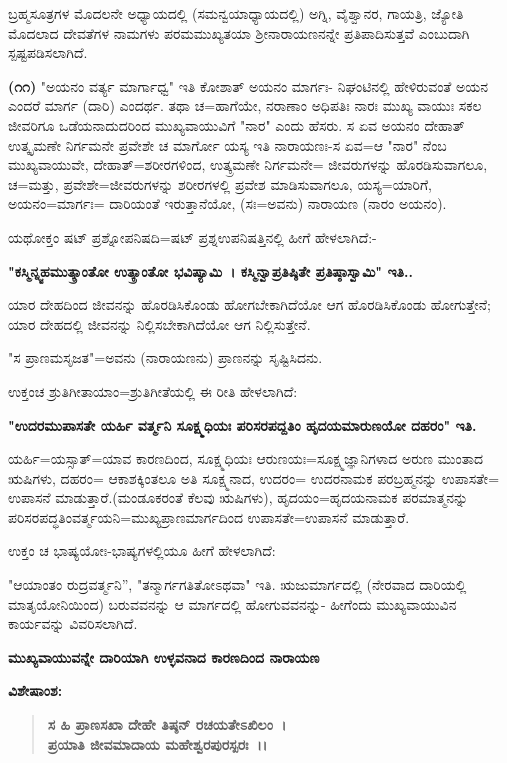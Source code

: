 ಬ್ರಹ್ಮಸೂತ್ರಗಳ ಮೊದಲನೇ ಅಧ್ಯಾಯದಲ್ಲಿ (ಸಮನ್ವಯಾಧ್ಯಾಯದಲ್ಲಿ) ಅಗ್ನಿ, ವೈಶ್ವಾನರ, ಗಾಯತ್ರಿ, ಜ್ಯೋತಿ ಮೊದಲಾದ ದೇವತೆಗಳ ನಾಮಗಳು ಪರಮಮುಖ್ಯತಯಾ ಶ‍್ರೀನಾರಾಯಣನನ್ನೇ ಪ್ರತಿಪಾದಿಸುತ್ತವೆ ಎಂಬುದಾಗಿ ಸ್ಪಷ್ಟಪಡಿಸಲಾಗಿದೆ.

\textbf{(೧೧)} "ಅಯನಂ ವರ್ತ್ಯ ಮಾರ್ಗಾಧ್ವ" ಇತಿ ಕೋಶಾತ್ ಅಯನಂ ಮಾರ್ಗಃ- ನಿಘಂಟಿನಲ್ಲಿ ಹೇಳಿರುವಂತೆ ಅಯನ ಎಂದರೆ ಮಾರ್ಗ (ದಾರಿ) ಎಂದರ್ಥ. ತಥಾ ಚ=ಹಾಗೆಯೇ, ನರಾಣಾಂ ಅಧಿಪತಿಃ ನಾರಃ ಮುಖ್ಯ ವಾಯುಃ ಸಕಲ ಜೀವರಿಗೂ ಒಡೆಯನಾದುದರಿಂದ ಮುಖ್ಯವಾಯುವಿಗೆ "ನಾರ" ಎಂದು ಹೆಸರು. ಸ ಏವ ಅಯನಂ ದೇಹಾತ್ ಉತ್ಕೃಮಣೇ ನಿರ್ಗಮನೇ ಪ್ರವೇಶೇ ಚ ಮಾರ್ಗೋ ಯಸ್ಯ ಇತಿ ನಾರಾಯಣಃ-ಸ ಏವ=ಆ "ನಾರ" ನೆಂಬ ಮುಖ್ಯವಾಯುವೇ, ದೇಹಾತ್=ಶರೀರಗಳಿಂದ, ಉತ್ಕ್ರಮಣೇ ನಿರ್ಗಮನೇ= ಜೀವರುಗಳನ್ನು ಹೊರಡಿಸುವಾಗಲೂ, ಚ=ಮತ್ತು, ಪ್ರವೇಶೇ=ಜೀವರುಗಳನ್ನು ಶರೀರಗಳಲ್ಲಿ ಪ್ರವೇಶ ಮಾಡಿಸುವಾಗಲೂ, ಯಸ್ಯ=ಯಾರಿಗೆ, ಅಯನಂ=ಮಾರ್ಗಃ= ದಾರಿಯಂತೆ ಇರುತ್ತಾನೆಯೋ, (ಸಃ=ಅವನು) ನಾರಾಯಣ (ನಾರಂ ಅಯನಂ).

ಯಥೋಕ್ತಂ ಷಟ್ ಪ್ರಶ್ನೋಪನಿಷದಿ=ಷಟ್ ಪ್ರಶ್ನಉಪನಿಷತ್ತಿನಲ್ಲಿ ಹೀಗೆ ಹೇಳಲಾಗಿದೆ:-

\textbf{"ಕಸ್ಮಿನ್ನ್ವಹಮುತ್ಕ್ರಾಂತೋ ಉತ್ಕ್ರಾಂತೋ ಭವಿಷ್ಯಾಮಿ~। ಕಸ್ಮಿನ್ವಾಪ್ರತಿಷ್ಠಿತೇ ಪ್ರತಿಷ್ಠಾಸ್ವಾಮಿ" ಇತಿ..}

ಯಾರ ದೇಹದಿಂದ ಜೀವನನ್ನು ಹೊರಡಿಸಿಕೊಂಡು ಹೋಗಬೇಕಾಗಿದೆಯೋ ಆಗ ಹೊರಡಿಸಿಕೊಂಡು ಹೋಗುತ್ತೇನೆ; ಯಾರ ದೇಹದಲ್ಲಿ ಜೀವನನ್ನು ನಿಲ್ಲಿಸಬೇಕಾಗಿದೆಯೋ ಆಗ ನಿಲ್ಲಿಸುತ್ತೇನೆ.

"ಸ ಪ್ರಾಣಮಸೃಜತ"=ಅವನು (ನಾರಾಯಣನು) ಪ್ರಾಣನನ್ನು ಸೃಷ್ಟಿಸಿದನು.

ಉಕ್ತಂಚ ಶ್ರುತಿಗೀತಾಯಾಂ=ಶ್ರುತಿಗೀತೆಯಲ್ಲಿ ಈ ರೀತಿ ಹೇಳಲಾಗಿದೆ:

\textbf{"ಉದರಮುಪಾಸತೇ ಯರ್ಹಿ ವರ್ತ್ಮನಿ ಸೂಕ್ಷ್ಮಧಿಯಃ ಪರಿಸರಪದ್ದತಿಂ ಹೃದಯಮಾ\-ರುಣಯೋ ದಹರಂ" ಇತಿ.}

ಯರ್ಹಿ=ಯಸ್ಸಾತ್=ಯಾವ ಕಾರಣದಿಂದ, ಸೂಕ್ಷ್ಮಧಿಯಃ ಆರುಣಯಃ=ಸೂಕ್ಷ್ಮಜ್ಞಾನಿ\-ಗಳಾದ ಅರುಣ ಮುಂತಾದ ಋಷಿಗಳು, ದಹರಂ= ಆಕಾಶಕ್ಕಿಂತಲೂ ಅತಿ ಸೂಕ್ಷ್ಮನಾದ, ಉದರಂ= ಉದರನಾಮಕ ಪರಬ್ರಹ್ಮನನ್ನು ಉಪಾಸತೇ= ಉಪಾಸನೆ ಮಾಡುತ್ತಾರೆ.\break (ಮಂಡೂಕ\-ರಂತೆ ಕೆಲವು ಋಷಿಗಳು), ಹೃದಯಂ=ಹೃದಯನಾಮಕ ಪರಮಾತ್ಮನನ್ನು ಪರಿ\-ಸರಪದ್ಧತಿಂವರ್ತ್ಮಯನಿ=ಮುಖ್ಯಪ್ರಾಣಮಾರ್ಗದಿಂದ ಉಪಾಸತೇ=ಉಪಾಸನೆ ಮಾಡುತ್ತಾರೆ.

ಉಕ್ತಂ ಚ ಭಾಷ್ಯಯೋಃ-ಭಾಷ್ಯಗಳಲ್ಲಿಯೂ ಹೀಗೆ ಹೇಳಲಾಗಿದೆ:

"ಆಯಾಂತಂ ರುದ್ರವರ್ತ್ಮನಿ'', "ತನ್ಮಾರ್ಗಗತಿತೋಽಥವಾ" ಇತಿ. ಋಜುಮಾರ್ಗದಲ್ಲಿ (ನೇರವಾದ ದಾರಿಯಲ್ಲಿ ಮಾತೃಯೋನಿಯಿಂದ) ಬರುವವನನ್ನು ಆ ಮಾರ್ಗದಲ್ಲಿ ಹೋಗುವವನನ್ನು- ಹೀಗೆಂದು ಮುಖ್ಯವಾಯುವಿನ ಕಾರ್ಯವನ್ನು ವಿವರಿಸಲಾಗಿದೆ.

\eject

\begin{center}
\textbf{ಮುಖ್ಯವಾಯುವನ್ನೇ ದಾರಿಯಾಗಿ ಉಳ್ಳವನಾದ ಕಾರಣದಿಂದ ನಾರಾಯಣ}
\end{center}

\noindent
\textbf{ವಿಶೇಷಾಂಶ:\enginline{-}}

\begin{verse}
\textbf{ಸ ಹಿ ಪ್ರಾಣಸಖಾ ದೇಹೇ ತಿಷ್ಠನ್ ರಚಯತೇಽಖಿಲಂ~।}\\\textbf{ಪ್ರಯಾತಿ ಜೀವಮಾದಾಯ ಮಹೇಶ್ವರಪುರಸ್ಪರಃ~।।}
\end{verse}

